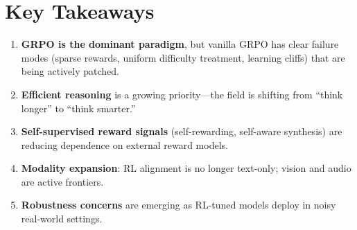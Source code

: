 \documentclass[11pt]{article}
\begin{document}
\section{Key Takeaways}

\begin{enumerate}
    \item \textbf{GRPO is the dominant paradigm}, but vanilla GRPO has clear failure modes (sparse rewards, uniform difficulty treatment, learning cliffs) that are being actively patched.
    \item \textbf{Efficient reasoning} is a growing priority---the field is shifting from ``think longer'' to ``think smarter.''
    \item \textbf{Self-supervised reward signals} (self-rewarding, self-aware synthesis) are reducing dependence on external reward models.
    \item \textbf{Modality expansion}: RL alignment is no longer text-only; vision and audio are active frontiers.
    \item \textbf{Robustness concerns} are emerging as RL-tuned models deploy in noisy real-world settings.
\end{enumerate}
\end{document}
